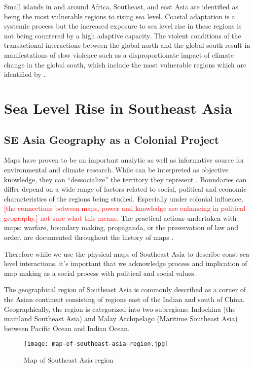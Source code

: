 Small islands in and around Africa, Southeast, and east Asia are identified as being the most vulnerable regions to rising sea level. Coastal adaptation is a systemic process but the increased exposure to sea level rise in these regions is not being countered by a high adaptive capacity. The violent conditions of the transactional interactions between the global north and the global south result in manifestations of slow violence such as a disproportionate impact of climate change in the global south, which include the most vulnerable regions which are identified by \citet{nicholls2010sea}. 


\section{Sea Level Rise in Southeast Asia}

\subsection{SE Asia Geography as a Colonial Project}

Maps have proven to be an important analytic as well as informative source for environmental and climate research. While can be interpreted as objective knowledge, they can ``dessocialize'' the territory they represent \citep{harley2009maps}. Boundaries can differ depend on a wide range of factors related to social, political and economic characteristics of the regions being studied. Especially under colonial influence, \textcolor{red}{[the connections between maps, power and knowledge are enhancing in political geography.] not sure what this means.} The practical actions undertaken with maps: warfare, boundary making, propaganda, or the preservation of law and order, are documented throughout the history of maps \citep{harley2009maps}. 

Therefore while we use the physical maps of Southeast Asia to describe coast-sea level interactions, it's important that we acknowledge process and implication of map making as a social process with political and social values. 

The geographical region of Southeast Asia is commonly described as a corner of the Asian continent consisting of regions east of the Indian and south of China. Geographically, the region is categorized into two subregions: Indochina (the mainland Southeast Asia) and Malay Archipelago (Maritime Southeast Asia) between Pacific Ocean and Indian Ocean. 

	\begin{figure}
\texttt{[image: map-of-southeast-asia-region.jpg]}
 \caption {Map of Southeast Asia region}
\label{fig:SEAsia}
      \end{figure}

